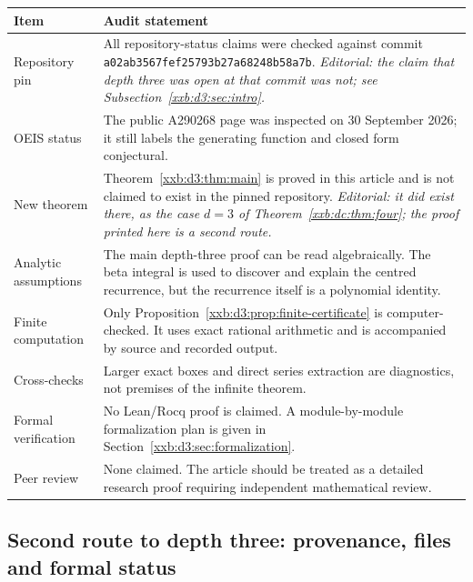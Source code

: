 \documentclass[11pt,a4paper]{article}
\numberwithin{equation}{section}
\theoremstyle{definition}
\theoremstyle{remark}
\theoremstyle{plain}
\begin{document}
\begin{longtable}{@{}>{\raggedright\arraybackslash}p{}>{\raggedright\arraybackslash}p{}@{}}
\toprule
Item & Audit statement\\
\midrule
\endhead
Repository pin & All repository-status claims were checked against commit
\texttt{a02ab3567fef2579\allowbreak 3b27a68248b58a7b\allowbreak 69694342}.
\emph{Editorial: the claim that depth three was open at that commit was not;
see Subsection~\ref{xxb:d3:sec:intro}.}\\
OEIS status & The public A290268 page was inspected on 30 September 2026; it
still labels the generating function and closed form conjectural.\\
New theorem & Theorem~\ref{xxb:d3:thm:main} is proved in this article and is
not claimed to exist in the pinned repository.
\emph{Editorial: it did exist there, as the case $d=3$ of
Theorem~\ref{xxb:dc:thm:four}; the proof printed here is a second route.}\\
Analytic assumptions & The main depth-three proof can be read algebraically.
The beta integral is used to discover and explain the centred recurrence, but
the recurrence itself is a polynomial identity.\\
Finite computation & Only Proposition~\ref{xxb:d3:prop:finite-certificate} is
computer-checked.  It uses exact rational arithmetic and is accompanied by
source and recorded output.\\
Cross-checks & Larger exact boxes and direct series extraction are
diagnostics, not premises of the infinite theorem.\\
Formal verification & No Lean/Rocq proof is claimed.  A module-by-module
formalization plan is given in Section~\ref{xxb:d3:sec:formalization}.\\
Peer review & None claimed.  The article should be treated as a detailed
research proof requiring independent mathematical review.\\
\bottomrule
\end{longtable}

\subsection{Second route to depth three: provenance, files and formal status}\label{xxb:d3:sec:provenance}
\end{document}
